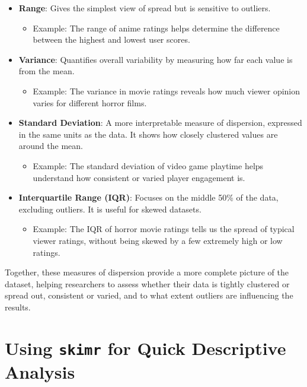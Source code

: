 \documentclass[
]{book}
\providecommand{\tightlist}{%
  \setlength{\itemsep}{0pt}\setlength{\parskip}{0pt}}
\begin{document}
\begin{itemize}
\tightlist
\item
  \textbf{Range}: Gives the simplest view of spread but is sensitive to outliers.

  \begin{itemize}
  \tightlist
  \item
    Example: The range of anime ratings helps determine the difference between the highest and lowest user scores.
  \end{itemize}
\item
  \textbf{Variance}: Quantifies overall variability by measuring how far each value is from the mean.

  \begin{itemize}
  \tightlist
  \item
    Example: The variance in movie ratings reveals how much viewer opinion varies for different horror films.
  \end{itemize}
\item
  \textbf{Standard Deviation}: A more interpretable measure of dispersion, expressed in the same units as the data. It shows how closely clustered values are around the mean.

  \begin{itemize}
  \tightlist
  \item
    Example: The standard deviation of video game playtime helps understand how consistent or varied player engagement is.
  \end{itemize}
\item
  \textbf{Interquartile Range (IQR)}: Focuses on the middle 50\% of the data, excluding outliers. It is useful for skewed datasets.

  \begin{itemize}
  \tightlist
  \item
    Example: The IQR of horror movie ratings tells us the spread of typical viewer ratings, without being skewed by a few extremely high or low ratings.
  \end{itemize}
\end{itemize}

Together, these measures of dispersion provide a more complete picture of the dataset, helping researchers to assess whether their data is tightly clustered or spread out, consistent or varied, and to what extent outliers are influencing the results.

\section{\texorpdfstring{Using \texttt{skimr} for Quick Descriptive Analysis}{Using skimr for Quick Descriptive Analysis}}\label{using-skimr-for-quick-descriptive-analysis}
\end{document}
